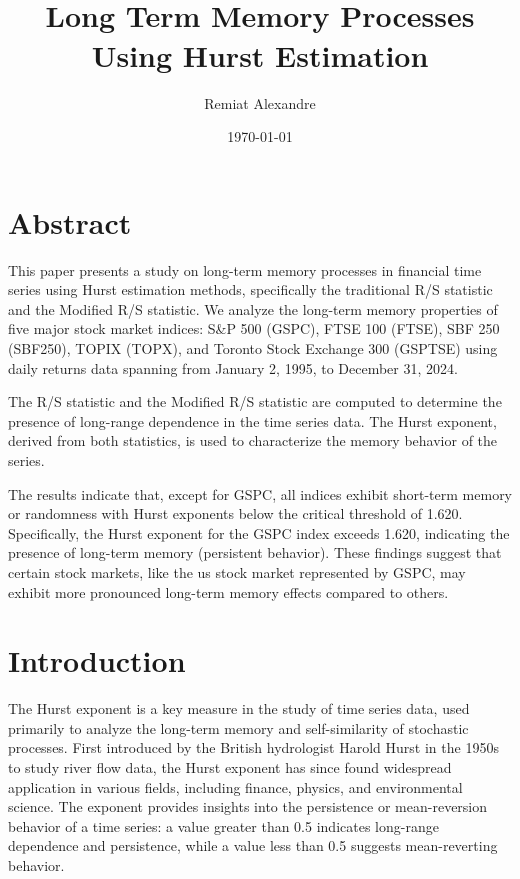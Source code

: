 \documentclass[11pt]{extarticle}
\title{
    \hspace*{-12cm}
    \vspace*{1cm}
    \protect\\
    \vspace*{1cm}
    \textbf{Long Term Memory Processes Using Hurst Estimation}
}
\author{Remiat Alexandre}
\date{\today}
\begin{document}

\maketitle

\vspace{1.5cm}
{
  \hypersetup{linkcolor=black}
  \tableofcontents
}

\newpage


\section*{Abstract}

This paper presents a study on long-term memory processes in financial time series using Hurst estimation methods, specifically the traditional R/S statistic and the Modified R/S statistic.
We analyze the long-term memory properties of five major stock market indices: S\&P 500 (GSPC), FTSE 100 (FTSE), SBF 250 (SBF250), TOPIX (TOPX), and Toronto Stock Exchange 300 (GSPTSE) using daily returns data spanning from January 2, 1995, to December 31, 2024.

The R/S statistic and the Modified R/S statistic are computed to determine the presence of long-range dependence in the time series data. The Hurst exponent, derived from both statistics, is used to characterize the memory behavior of the series.

The results indicate that, except for GSPC, all indices exhibit short-term memory or randomness with Hurst exponents below the critical threshold of 1.620.
Specifically, the Hurst exponent for the GSPC index exceeds 1.620, indicating the presence of long-term memory (persistent behavior).
These findings suggest that certain stock markets, like the us stock market represented by GSPC, may exhibit more pronounced long-term memory effects compared to others.


\newpage

\section{Introduction}

The Hurst exponent is a key measure in the study of time series data, used primarily to analyze the long-term memory and self-similarity of stochastic processes. First introduced by the British hydrologist Harold Hurst in the 1950s to study river flow data, the Hurst exponent has since found widespread application in various fields, including finance, physics, and environmental science. The exponent provides insights into the persistence or mean-reversion behavior of a time series: a value greater than 0.5 indicates long-range dependence and persistence, while a value less than 0.5 suggests mean-reverting behavior.
\end{document}
